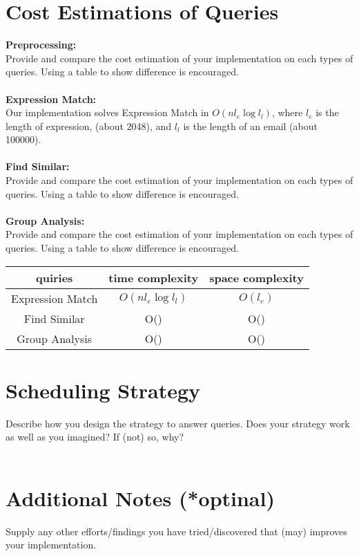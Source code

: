 \documentclass{article}
\begin{document}
\section*{Cost Estimations of Queries}
\textbf{Preprocessing:}\\
Provide and compare the cost estimation of your implementation on each types of queries. Using a table to show difference is encouraged.\\ \\
\textbf{Expression Match:}\\
Our implementation solves Expression Match in $O(n l_e \log l_l)$, where $l_e$ is the length of expression, (about 2048), and $l_l$ is the length of an email (about 100000).\\ \\
\textbf{Find Similar:}\\
Provide and compare the cost estimation of your implementation on each types of queries. Using a table to show difference is encouraged.\\ \\
\textbf{Group Analysis:}\\
Provide and compare the cost estimation of your implementation on each types of queries. Using a table to show difference is encouraged.\\

\begin{center}
 \begin{tabular}{||c c c||} 
 \hline
 \textbf{quiries} & \textbf{time complexity} & \textbf{space complexity} \\ [0.5ex] 
 \hline\hline
 Expression Match & $O(n l_e \log l_l)$ & $O(l_e)$ \\ 
 \hline
 Find Similar & O() & O() \\
 \hline
 Group Analysis & O() & O() \\
 \hline
\end{tabular}
\end{center}

\section*{Scheduling Strategy}
Describe how you design the strategy to answer queries. Does your strategy work as well as you imagined? If (not) so, why?\\ \\


\section*{Additional Notes (*optinal)}
Supply any other efforts/findings you have tried/discovered that (may) improves your implementation.
\end{document}
